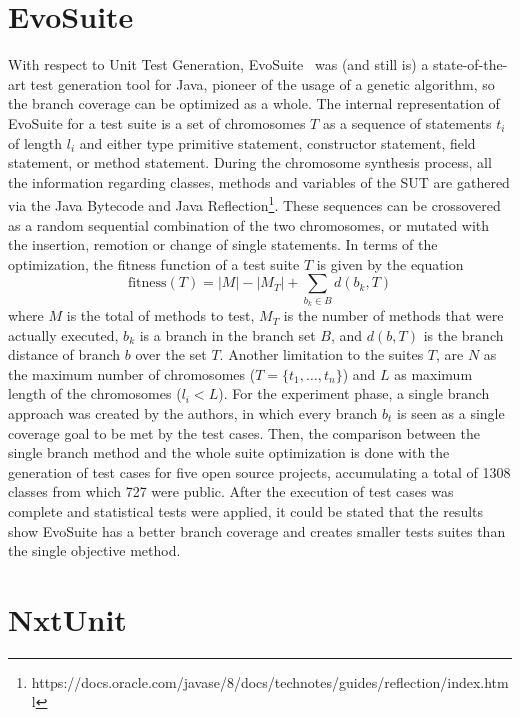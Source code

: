 \documentclass[%
  chapterprefix=false,%
  open=right,%
  twoside=true,%
  paper=a4,%
  logofile={Figures/logo.png},%
  thesistype=master,%
  UKenglish,%
]{se2thesis}
\begin{document}
\section{EvoSuite}

With respect to Unit Test Generation, EvoSuite~\cite{DBLP:conf/qsic/FraserA11} was (and still is) a state-of-the-art test generation tool for Java, pioneer of the usage of a genetic algorithm, so the branch coverage can be optimized as a whole.
The internal representation of EvoSuite for a test suite is a set of chromosomes \(T\) as a sequence of statements \(t_i\) of length \(l_i\) and either type primitive statement, constructor statement, field statement, or method statement.
During the chromosome synthesis process, all the information regarding classes, methods and variables of the SUT are gathered via the Java Bytecode and Java Reflection\footnote{https://docs.oracle.com/javase/8/docs/technotes/guides/reflection/index.html}.
These sequences can be crossovered as a random sequential combination of the two chromosomes, or mutated with the insertion, remotion or change of single statements.
In terms of the optimization, the fitness function of a test suite $T$ is given by the equation
\[ \text{fitness}(T) = |M| - |M_T| + \sum_{b_k \in B} d(b_k, T) \]
where \(M\) is the total of methods to test, \(M_T\) is the number of methods that were actually executed, \(b_k\) is a branch in the branch set \(B\), and \(d(b, T)\) is the branch distance of branch \(b\) over the set \(T\).
Another limitation to the suites \(T\), are \(N\) as the maximum number of chromosomes (\(T = \{t_1, \dots , t_n\}\)) and \(L\) as maximum length of the chromosomes (\(l_i < L\)).
For the experiment phase, a single branch approach was created by the authors, in which every branch \(b_t\) is seen as a single coverage goal to be met by the test cases.
Then, the comparison between the single branch method and the whole suite optimization is done with the generation of test cases for five open source projects, accumulating a total of 1308 classes from which 727 were public.
After the execution of test cases was complete and statistical tests were applied, it could be stated that the results show EvoSuite has a better branch coverage and creates smaller tests suites than the single objective method.

\section{NxtUnit}
\end{document}
